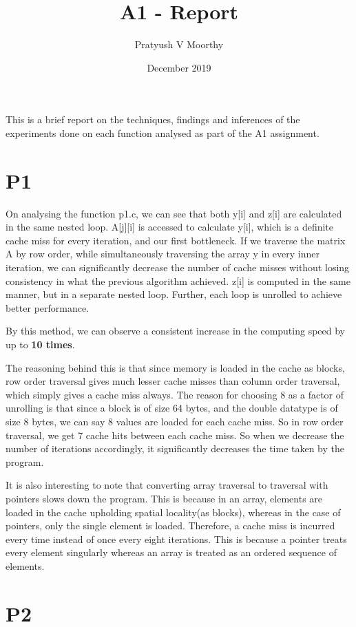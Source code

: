 \documentclass{article}
\title{A1 - Report}
\author{Pratyush V Moorthy }
\date{December 2019}
\begin{document}
\maketitle


This is a brief report on the techniques, findings and inferences of the experiments done on each function analysed as part of the A1 assignment. 

\section{P1}

On analysing the function p1.c, we can see that both y[i] and z[i] are calculated in the same nested loop. A[j][i] is accessed to calculate y[i], which is a definite cache miss for every iteration, and our first bottleneck. If we traverse the matrix A by row order, while simultaneously traversing the array y in every inner iteration, we can significantly decrease the number of cache misses without losing consistency in what the previous algorithm achieved. z[i] is computed in the same manner, but in a separate nested loop. Further, each loop is unrolled to achieve better performance.

By this method, we can observe a consistent increase in the computing speed by up to \textbf{10 times}.

The reasoning behind this is that since memory is loaded in the cache as blocks, row order traversal gives much lesser cache misses than column order traversal, which simply gives a cache miss always. The reason for choosing 8 as a factor of unrolling is that since a block is of size 64 bytes, and the double datatype is of size 8 bytes, we can say 8 values are loaded for each cache miss. So in row order traversal, we get 7 cache hits between each cache miss. So when we decrease the number of iterations accordingly, it significantly decreases the time taken by the program.

It is also interesting to note that converting array traversal to traversal with pointers slows down the program. This is because in an array, elements are loaded in the cache upholding spatial locality(as blocks), whereas in the case of pointers, only the single element is loaded. Therefore, a cache miss is incurred every time instead of once every eight iterations. This is because a pointer treats every element singularly whereas an array is treated as an ordered sequence of elements.

\section{P2}
\end{document}
